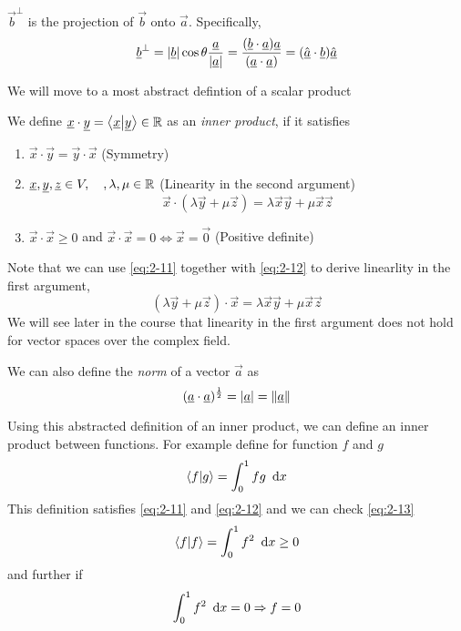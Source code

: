 \documentclass{article}
\numberwithin{equation}{section}
\begin{document}
\begin{defi}[Projection]
    $\vec{b}^\perp$ is the projection of $\vec{b}$ onto $\vec{a}$. Specifically, 
    \begin{equation}
        \underline{b}^\perp = \left\lvert \underline{b}\right\rvert\cos{\theta}\frac{\underline{a}}{\left\lvert \underline{a}\right\rvert} = \frac{(\underline{b}\cdot\underline{a})\underline{a}}{(\underline{a}\cdot\underline{a})} = (\hat{\underline{a}} \cdot \underline{b})\hat{\underline{a}} 
    \end{equation}
\end{defi}

We will move to a most abstract defintion of a scalar product
\begin{defi}
    We define $\underline{x} \cdot \underline{y} = \left\langle \underline{x}\middle\vert \underline{y} \right\rangle \in \mathbb{R}$ as an \emph{inner product}, if it satisfies
    \begin{enumerate}[eqn]
        \item $\vec{x} \cdot \vec{y} = \vec{y} \cdot \vec{x}$ \hspace*{\fill}(Symmetry) \label{eq:2-11}
        \item $\underline{x}, \underline{y}, \underline{z} \in V, \quad, \lambda, \mu \in \mathbb{R}$ \hspace*{\fill}(Linearity in the second argument) \label{eq:2-12}
        \[
            \vec{x} \cdot (\lambda\vec{y} + \mu\vec{z}) = \lambda\vec{x}\vec{y} + \mu\vec{x}\vec{z}  
        \]
        \item $\vec{x} \cdot \vec{x} \geq 0 $ and $\vec{x} \cdot \vec{x} = 0 \Leftrightarrow \vec{x} = \vec{0}$ \hspace*{\fill}(Positive definite) \label{eq:2-13}
    \end{enumerate}

    Note that we can use \eqref{eq:2-11} together with \eqref{eq:2-12} to derive linearlity in the first argument,
    \begin{equation}
        (\lambda\vec{y} + \mu\vec{z}) \cdot \vec{x} = \lambda\vec{x}\vec{y} + \mu\vec{x}\vec{z} \label{eq:2-15}
    \end{equation}
    We will see later in the course that linearity in the first argument does not hold for vector spaces over the complex field.

    We can also define the \emph{norm} of a vector $\vec{a}$ as 
    \[
        (\underline{a} \cdot \underline{a})^\frac{1}{2} = \left\lvert \underline{a}\right\rvert = \left\lVert \underline{a}\right\rVert  
    \]
\end{defi}

\begin{remark}
    Using this abstracted definition of an inner product, we can define an inner product between functions. For example define for function $f$ and $g$
    \[
        \left\langle f\middle\vert g \right\rangle = \int_{0}^{1}{fg \ \mathop{}\!\mathrm{d} x}
    \]
    This definition satisfies \eqref{eq:2-11} and \eqref{eq:2-12} and we can check \eqref{eq:2-13}
    \[
        \left\langle f\middle\vert f \right\rangle = \int_{0}^{1}{f^2 \ \mathop{}\!\mathrm{d} x} \geq 0
    \]
    and further if 
    \[
        \int_{0}^{1}{f^2 \ \mathop{}\!\mathrm{d} x} = 0 \Rightarrow f = 0
    \]
\end{remark}
\end{document}
